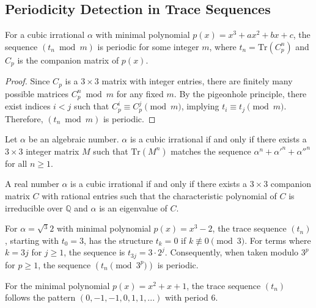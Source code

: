 \subsection{Periodicity Detection in Trace Sequences}

\begin{theorem}
For a cubic irrational $\alpha$ with minimal polynomial $p(x) = x^3 + ax^2 + bx + c$, the sequence $(t_n \bmod m)$ is periodic for some integer $m$, where $t_n = \text{Tr}(C_p^n)$ and $C_p$ is the companion matrix of $p(x)$.
\end{theorem}

\begin{proof}
Since $C_p$ is a $3 \times 3$ matrix with integer entries, there are finitely many possible matrices $C_p^n \bmod m$ for any fixed $m$. By the pigeonhole principle, there exist indices $i < j$ such that $C_p^i \equiv C_p^j \pmod{m}$, implying $t_i \equiv t_j \pmod{m}$. Therefore, $(t_n \bmod m)$ is periodic.
\end{proof}

\begin{theorem}
Let $\alpha$ be an algebraic number. $\alpha$ is a cubic irrational if and only if there exists a $3 \times 3$ integer matrix $M$ such that $\text{Tr}(M^n)$ matches the sequence $\alpha^n + \alpha'^n + \alpha''^n$ for all $n \geq 1$.
\end{theorem}

\begin{theorem}\label{thm:matrix_cubic}
A real number $\alpha$ is a cubic irrational if and only if there exists a $3 \times 3$ companion matrix $C$ with rational entries such that the characteristic polynomial of $C$ is irreducible over $\mathbb{Q}$ and $\alpha$ is an eigenvalue of $C$.
\end{theorem}

\begin{proposition}
For $\alpha = \sqrt{^3}{2}$ with minimal polynomial $p(x) = x^3 - 2$, the trace sequence $(t_n)$, starting with $t_0=3$, has the structure $t_k = 0$ if $k \not\equiv 0 \pmod{3}$. For terms where $k = 3j$ for $j \geq 1$, the sequence is $t_{3j} = 3 \cdot 2^j$. Consequently, when taken modulo $3^p$ for $p \ge 1$, the sequence $(t_n \pmod{3^p})$ is periodic.
\end{proposition}

\begin{proposition}
For the minimal polynomial $p(x) = x^2 + x + 1$, the trace sequence $(t_n)$ follows the pattern $(0, -1, -1, 0, 1, 1, ...)$ with period 6.
\end{proposition}

